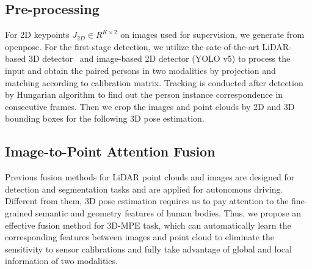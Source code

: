 \documentclass[letterpaper]{article} %
\begin{document}
\subsection{Pre-processing}
For 2D keypoints $J_{2D} \in R^{K \times 2}$ on images used for supervision, we generate from openpose\cite{cao2017realtime}. For the first-stage detection, we utilize the sate-of-the-art LiDAR-based 3D detector~\cite{Cong_2022_CVPR} and image-based 2D detector (YOLO v5) to process the input and obtain the paired persons in two modalities by projection and matching according to calibration matrix. Tracking is conducted after detection by Hungarian algorithm to find out the person instance correspondence in consecutive frames. Then we crop the images and point clouds by 2D and 3D bounding boxes for the following 3D pose estimation. 


\subsection{Image-to-Point Attention Fusion}
Previous fusion methods for LiDAR point clouds and images are designed for detection and segmentation tasks and are applied for autonomous driving. Different from them, 3D pose estimation requires us to pay attention to the fine-grained semantic and geometry features of human bodies. Thus, we propose an effective fusion method for 3D-MPE task, which can automatically learn the corresponding features between images and point cloud to eliminate the sensitivity to sensor calibrations and fully take advantage of global and local information of two modalities.


\end{document}
